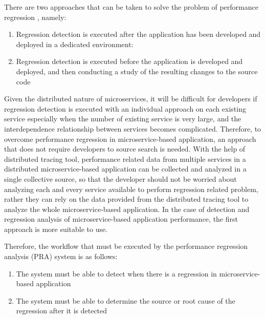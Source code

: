 \documentclass[conference]{configs/IEEEtran}
\begin{document}
There are two approaches that can be taken to solve the problem of performance regression \cite{regression-detection}, namely:
\begin{enumerate}
	\item Regression detection is executed after the application has been developed and deployed in a dedicated environment:
	\item Regression detection is executed before the application is developed and deployed, and then conducting a study of the resulting changes to the source code
\end{enumerate} 

Given the distributed nature of microservices, it will be difficult for developers if regression detection is executed with an individual approach on each existing service especially when the number of existing service is very large, and the interdependence relationship between services becomes complicated. Therefore, to overcome performance regression in microservice-based application, an approach that does not require developers to source search is needed. With the help of distributed tracing tool, performance related data from multiple services in a distributed microservice-based application can be collected and analyzed in a single collective source, so that the developer should not be worried about analyzing each and every service available to perform regression related problem, rather they can rely on the data provided from the distributed tracing tool to analyze the whole microservice-based application. In the case of detection and regression analysis of microservice-based application performance, the first approach is more suitable to use.

Therefore, the workflow that must be executed by the performance regression analysis (PRA) system is as follows:
\begin{enumerate}
	\item The system must be able to detect when there is a regression in microservice-based application
	\item The system must be able to determine the source or root cause of the regression after it is detected
\end{enumerate}
\end{document}
